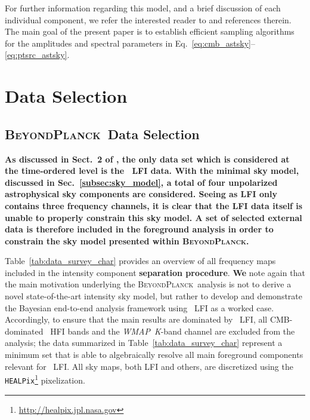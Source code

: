 \documentclass[twocolumn]{aa}
\def\WMAP{\emph{WMAP}}
\def\healpix{\texttt{HEALPix}}
\newcommand{\BP}{\textsc{BeyondPlanck}}
\begin{document}
For further information regarding this model, and a brief discussion
of each individual component, we refer the interested reader to
\citet{bp01} and references therein. The main goal of the present
paper is to establish efficient sampling algorithms for the amplitudes
and spectral parameters in Eq.~\eqref{eq:cmb_astsky}--\eqref{eq:ptsrc_astsky}. 

\section{Data Selection}
\label{sec:data}



\subsection{\BP\ Data Selection}
\label{subsec:bp_data_selection}

\textbf{As discussed in Sect.~2 of \cite{bp01}, the only data set which is considered at the time-ordered level is the \Planck\ LFI data. With the minimal sky model, discussed in Sec.~\ref{subsec:sky_model}, a total of four unpolarized astrophysical sky components are considered. Seeing as LFI only contains three frequency channels, it is clear that the LFI data itself is unable to properly constrain this sky model. A set of selected external data is therefore included in the foreground analysis in order to constrain the sky model presented within \BP.}

Table~\ref{tab:data_survey_char} provides an overview of all frequency
maps included in the intensity component \textbf{separation procedure}. \textbf{We} note again that the main motivation underlying the \BP\ 
analysis is not to derive a
novel state-of-the-art intensity sky model, but rather to develop and
demonstrate the Bayesian end-to-end analysis framework using
\Planck\ LFI as a worked case. Accordingly, to ensure that the main
results are dominated by \Planck\ LFI, all CMB-dominated \Planck\ HFI
bands and the \WMAP\ \textit{K}-band channel are excluded from the analysis;
the data summarized in Table~\ref{tab:data_survey_char} represent a
minimum set that is able to algebraically resolve all main foreground
components relevant for \Planck\ LFI. All sky maps, both LFI and
others, are discretized using the
\healpix\footnote{\url{http://healpix.jpl.nasa.gov}} \citep{gorski2005}
pixelization. 
\end{document}
